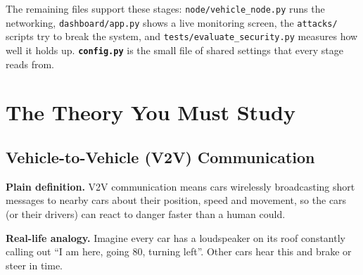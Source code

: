 \documentclass[11pt,a4paper]{report}
\begin{document}
\noindent The remaining files support these stages: \texttt{node/vehicle\_node.py}
runs the networking, \texttt{dashboard/app.py} shows a live monitoring screen,
the \texttt{attacks/} scripts try to break the system, and
\texttt{tests/evaluate\_security.py} measures how well it holds up.
\textbf{\texttt{config.py}} is the small file of shared settings that every
stage reads from.

\begin{center}
\end{center}

\section{The Theory You Must Study}

\subsection{Vehicle-to-Vehicle (V2V) Communication}
\textbf{Plain definition.} V2V communication means cars wirelessly broadcasting
short messages to nearby cars about their position, speed and movement, so the
cars (or their drivers) can react to danger faster than a human could.

\textbf{Real-life analogy.} Imagine every car has a loudspeaker on its roof
constantly calling out ``I am here, going 80, turning left''. Other cars hear
this and brake or steer in time.
\end{document}
